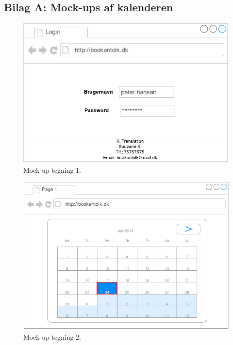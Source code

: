 \documentclass[12pt]{article}   %
\begin{document}
\subsection{Bilag A: Mock-ups af kalenderen}

\begin{figure}[!ht]
\begin{center}
\includegraphics{mock1.pdf}
\caption{Mock-up tegning 1.}
\end{center}
\end{figure}


\newpage

\begin{figure}[!ht]
\begin{center}
\includegraphics{mock2.pdf}
\caption{Mock-up tegning 2.}
\end{center}
\end{figure}
\end{document}

